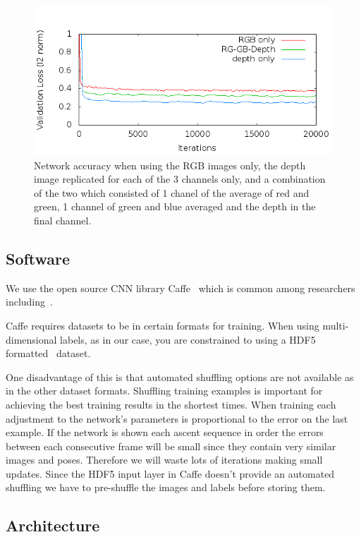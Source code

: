 \documentclass[11pt]{article} %
\begin{document}
\begin{figure}
\includegraphics*[width=0.9\linewidth,clip]{rgb-dComp.png} %
\caption{Network accuracy when using the RGB images only, the depth image replicated for each of the 3 channels only, and a combination of the two which consisted of 1 chanel of the average of red and green, 1 channel of green and blue averaged and the depth in the final channel. }
\label{fig:rgbdcomp}
\end{figure}





\subsection{Software}

We use the open source CNN library Caffe~\cite{Jia2014} which is common among researchers including~\cite{Chen, Pfister,Girshick2014,Springenberg2015,Schwarz2015,Simonyan2015,Wang2015}. 

Caffe requires datasets to be in certain formats for training. When using multi-dimensional labels, as in our case, you are constrained to using a HDF5 formatted~\cite{Folk2011} dataset. 

One disadvantage of this is that automated shuffling options are not available as in the other dataset formats. Shuffling training examples is important for achieving the best training results in the shortest times. When training each adjustment to the network's parameters is proportional to the error on the last example. If the network is shown each ascent sequence in order the errors between each consecutive frame will be small since they contain very similar images and poses. Therefore we will waste lots of iterations making small updates. Since the HDF5 input layer in Caffe doesn't provide an automated shuffling we have to pre-shuffle the images and labels before storing them.

\subsection{Architecture}
\end{document}
